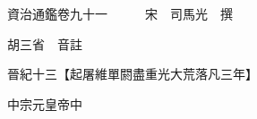 










 


 
 


 

  
  
  
  
  





  
  
  
  
  
 
  

  

  
  
  



  

 
 

  
   




  

  
  


  　　資治通鑑卷九十一　　　宋　司馬光　撰

　　胡三省　音註

　　晉紀十三【起屠維單閼盡重光大荒落凡三年】

　　中宗元皇帝中

